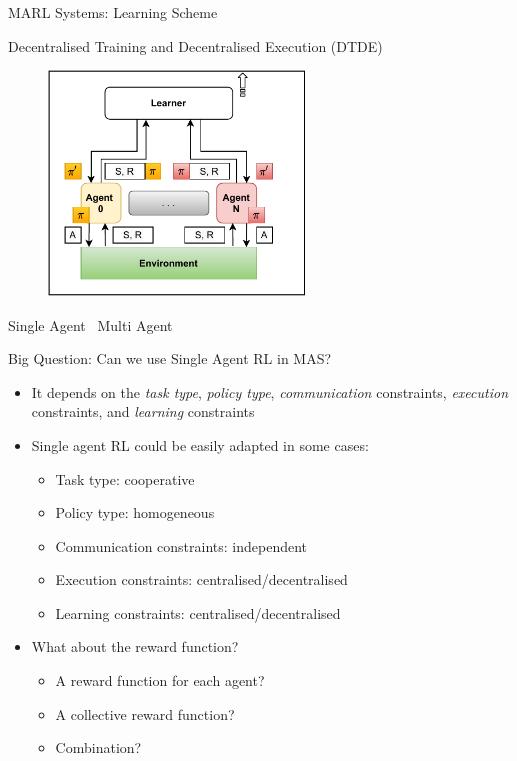 \documentclass[presentation, 8pt]{beamer}\mode<presentation>{\usetheme{AMSBolognaFC}}
\begin{document}
	
	\begin{frame}{MARL Systems: Learning Scheme}
		\begin{exampleblock}{Decentralised Training and Decentralised Execution (DTDE)}
			\begin{figure}
				\includegraphics[height=6cm]{img/learning-scheme-ctde.pdf}
			\end{figure}
		\end{exampleblock}
	\end{frame}
\begin{frame}{Single Agent \faArrowRight \, Multi Agent}
\begin{alertblock}{Big Question: Can we use Single Agent RL in MAS?}
\begin{itemize}
	\item It depends on the \emph{task type}, \emph{policy type}, \emph{communication} constraints, \emph{execution} constraints, and \emph{learning} constraints
	\item Single agent RL could be easily adapted in some cases:
	\begin{itemize}
		\item Task type: cooperative
		\item Policy type: homogeneous
		\item Communication constraints: independent
		\item Execution constraints: centralised/decentralised
		\item Learning constraints: centralised/decentralised
	\end{itemize}
	\item What about the reward function?
	\begin{itemize}
		\item A reward function for each agent?
		\item A collective reward function?
		\item Combination?
	\end{itemize}
\end{itemize}
\end{alertblock}
\end{frame}
\end{document}
